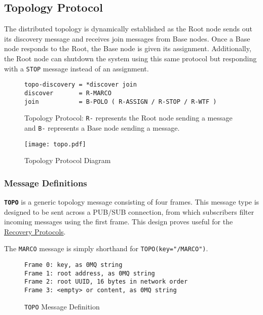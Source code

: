 \subsection{Topology Protocol}
\label{proto_topo}

The \dcamp distributed topology is dynamically established as the Root node sends out its discovery message and receives
join messages from Base nodes. Once a Base node responds to the Root, the Base node is given its assignment.
Additionally, the Root node can shutdown the system using this same protocol but responding with a \texttt{STOP} message
instead of an assignment.

\begin{figure}[H]
\vspace{+10pt}
\begin{verbatim}
topo-discovery = *discover join
discover       = R-MARCO
join           = B-POLO ( R-ASSIGN / R-STOP / R-WTF )
\end{verbatim}
\vspace{-5pt}
\caption[Topology Protocol]
        {Topology Protocol: \texttt{R-} represents the Root node sending a message and \texttt{B-}
         represents a Base node sending a message.}
\label{fig:proto_topo_spec}
\end{figure}

\begin{figure}[H]
    \centering
    \texttt{[image: topo.pdf]}
    \label{fig:proto_topo_image}
    \caption{Topology Protocol Diagram}
\end{figure}

\subsubsection{Message Definitions}

\textbf{\texttt{TOPO}} is a generic topology message consisting of four frames. This message type is designed to be sent
across a PUB/SUB connection, from which subscribers filter incoming messages using the first frame. This design proves
useful for the \hyperref[proto_reco]{Recovery Protocols}.

The \texttt{MARCO} message is simply shorthand for \texttt{TOPO(key="/MARCO")}.

\begin{figure}[H]
\vspace{+10pt}
\begin{verbatim}
Frame 0: key, as 0MQ string
Frame 1: root address, as 0MQ string
Frame 2: root UUID, 16 bytes in network order
Frame 3: <empty> or content, as 0MQ string
\end{verbatim}
\vspace{-20pt}
\caption{\texttt{TOPO} Message Definition}
\label{fig:message_topo}
\end{figure}

